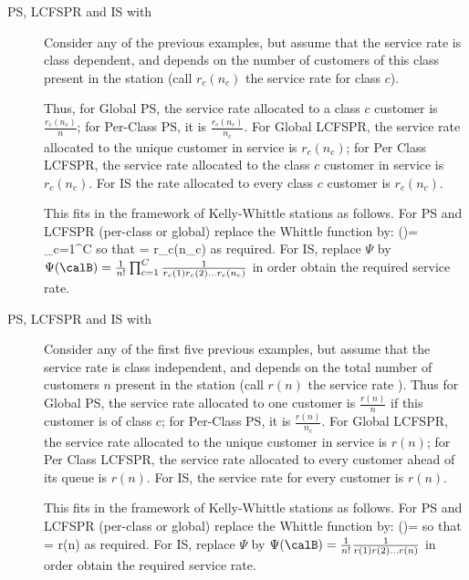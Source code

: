 \begin{description}
\item[PS, LCFSPR and IS with ]

Consider any of the previous examples, but assume
that the service rate is class dependent, and
depends on the number of customers of this class
present in the station (call $r_c(n_c)$ the
service rate for class $c$).

Thus, for Global PS, the service rate allocated
to a class $c$ customer is $\frac{r_c(n_c)}{n}$;
for Per-Class PS, it is $\frac{r_c(n_c)}{n_c}$.
For Global LCFSPR, the service rate allocated to
the unique customer in service is $r_c(n_c)$; for
Per Class LCFSPR, the service rate allocated to
the class $c$ customer in service is $r_c(n_c)$.
For IS the rate allocated to every class $c$
customer is $r_c(n_c)$.

This fits in the framework of Kelly-Whittle
stations as follows. For PS and LCFSPR (per-class
or global) replace the Whittle function by:
 \ben
   \Psi(\calB)=
   \prod_{c=1}^C 
 \een
 so that
 \ben
    {
    \Psi\lp \calB\rp
    } = r_c(n_c)
      \een as required.
For IS, replace $\Psi$ by
$
   \Psi(\calB)=
   \frac{1}{n!}
   \prod_{c=1}^C \frac{1}{r_c(1)r_c(2)... r_c(n_c)}
$ in order obtain the required service rate.


\item[PS, LCFSPR and IS with ]
Consider any of the first five previous examples,
but assume that the service rate is class
independent, and depends on the total number of
customers $n$  present in the station (call
$r(n)$ the service rate ). Thus for Global PS,
the service rate allocated to one customer is
$\frac{r(n)}{n}$ if this customer is of class
$c$; for Per-Class PS, it is $\frac{r(n)}{n_c}$.
For Global LCFSPR, the service rate allocated to
the unique customer in service is $r(n)$; for Per
Class LCFSPR, the service rate allocated to every
customer ahead of its queue is $r(n)$. For IS,
the service rate for every customer is $r(n)$.

This fits in the framework of Kelly-Whittle
stations as follows. For PS and LCFSPR (per-class
or global) replace the Whittle function by:
 \ben
   \Psi(\calB)= 
    \een
so that
 \ben
    {
    \Psi\lp \calB\rp
    } = r(n)
 \een
as required. For IS, replace $\Psi$ by $
\Psi(\calB)= \frac{1}{n!}\frac{1}{r(1)r(2)...
r(n)}$ in order obtain the required service rate.


\end{description}
